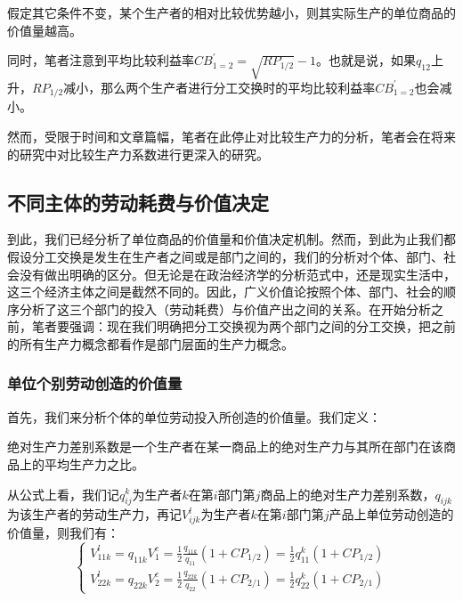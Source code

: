 \begin{conjecture}
    假定其它条件不变，某个生产者的相对比较优势越小，则其实际生产的单位商品的价值量越高。
\end{conjecture}

同时，笔者注意到平均比较利益率$ \mathit{CB}^{\prime}_{1=2} = \sqrt{\mathit{RP}_{1/2}} - 1 $。也就是说，如果$ q_{12} $上升，$ \mathit{RP}_{1/2} $减小，那么两个生产者进行分工交换时的平均比较利益率$ \mathit{CB}^{\prime}_{1=2} $也会减小。

然而，受限于时间和文章篇幅，笔者在此停止对比较生产力的分析，笔者会在将来的研究中对比较生产力系数进行更深入的研究。

\subsection{不同主体的劳动耗费与价值决定}

到此，我们已经分析了单位商品的价值量和价值决定机制。然而，到此为止我们都假设分工交换是发生在生产者之间或是部门之间的，我们的分析对个体、部门、社会没有做出明确的区分。但无论是在政治经济学的分析范式中，还是现实生活中，这三个经济主体之间是截然不同的。因此，广义价值论按照个体、部门、社会的顺序分析了这三个部门的投入（劳动耗费）与价值产出之间的关系。在开始分析之前，笔者要强调：现在我们明确把分工交换视为两个部门之间的分工交换，把之前的所有生产力概念都看作是部门层面的生产力概念。

\subsubsection{单位个别劳动创造的价值量}
首先，我们来分析个体的单位劳动投入所创造的价值量。我们定义：

\begin{definition}
    绝对生产力差别系数是一个生产者在某一商品上的绝对生产力与其所在部门在该商品上的平均生产力之比\cite[73]{CaiJiMingCongXiaYiJieZhiLunDaoGuangYiJieZhiLunXiuDingBan2022}。
\end{definition}

从公式上看，我们记$q_{ij}^k$为生产者$k$在第$i$部门第$j$商品上的绝对生产力差别系数，$q_{ijk}$为该生产者的劳动生产力，再记$V_{ijk}^{l}$为生产者$k$在第$i$部门第$j$产品上单位劳动创造的价值量，则我们有：
\begin{equation}
    \begin{cases}
        V_{11k}^{l} = q_{11k}V_{1}^{c} = \frac{1}{2}\frac{q_{11k}}{q_{11}}(1+\mathit{CP}_{1/2}) = \frac{1}{2}q_{11}^{k}(1+\mathit{CP}_{1/2}) \\
        V_{22k}^{l} = q_{22k}V_{2}^{c} = \frac{1}{2}\frac{q_{22k}}{q_{22}}(1+\mathit{CP}_{2/1})=\frac{1}{2}q_{22}^{k}(1+\mathit{CP}_{2/1})
    \end{cases}
\end{equation}


